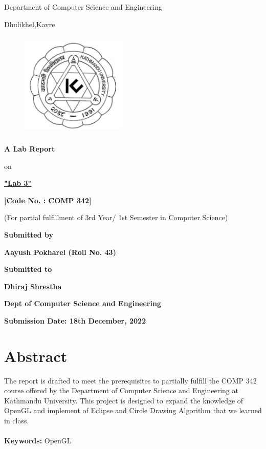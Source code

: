 \documentclass[12pt]{article}
\begin{document}
\thispagestyle{empty}

\section*{}
 {\LARGE{}}

\centerline{Department of Computer Science and Engineering}
\centerline{Dhulikhel,Kavre}
\begin{figure}[h]
    \centerline{\includegraphics[width=50.546mm,height=50.546mm]{KU_Logo.png}}
\end{figure}

\centerline{\textbf{A Lab Report}}
\centerline{on}
\centerline{\underline{\textbf{"Lab 3"}}}

\vspace*{12mm}

\centerline{\textbf{[Code No. : COMP 342]}}
\centerline{(For partial fulfillment of 3rd Year/ 1st Semester in Computer Science)}

\vspace*{20mm}

\centerline{\textbf{Submitted by}}
\centerline{\textbf{Aayush Pokharel (Roll No. 43)}}


\vspace*{26mm}


\centerline{\textbf{Submitted to}}
\centerline{\textbf{Dhiraj Shrestha}}
\centerline{\textbf{Dept of Computer Science and Engineering}}

\vspace*{20mm}

\centerline{\textbf{Submission Date: 18th December, 2022}}



\clearpage
\thispagestyle{empty}


\section*{Abstract}
The report is drafted to meet the prerequisites to partially fulfill the COMP 342 course offered by the
Department of Computer Science and Engineering at Kathmandu University. This project is designed
to expand the knowledge of OpenGL and implement of Eclipse and Circle Drawing Algorithm that we learned in class.
\\\\
\textbf{Keywords:} OpenGL
\end{document}

